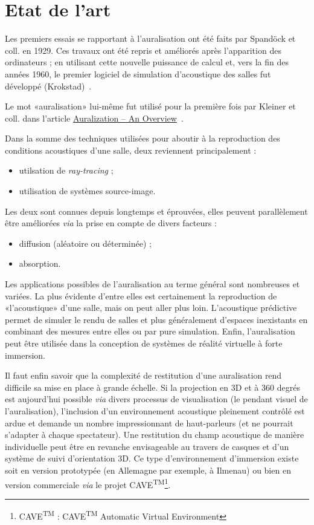 \chapter{Etat de l'art}

Les premiers essais se rapportant à l'auralisation ont été faits par Spandöck et coll. en 1929.
Ces travaux ont été repris et améliorés après l'apparition des ordinateurs ; en utilisant cette nouvelle puissance de
calcul et, vers la fin des années 1960, le premier logiciel de simulation d'acoustique des salles fut développé
(Krokstad)~\cite{Vor08}.

Le mot «auralisation» lui-même fut utilisé pour la première fois par Kleiner et coll. dans l'article
\underline{Auralization -- An Overview}~\cite{Kle93}.

Dans la somme des techniques utilisées pour aboutir à la reproduction des conditions acoustiques d'une salle, deux
reviennent principalement :

\begin{itemize}
    \item utilsation de \textit{ray-tracing} ;
    \item utilisation de systèmes source-image.
\end{itemize}

Les deux sont connues depuis longtemps et éprouvées, elles peuvent parallèlement être améliorées \textit{via} la prise en compte de
divers facteurs :

\begin{itemize}
    \item diffusion (aléatoire ou déterminée) ;
    \item absorption.
\end{itemize}

Les applications possibles de l'auralisation au terme général sont nombreuses et variées. La plus évidente d'entre
elles est certainement la reproduction de «l'acoustique» d'une salle, mais on peut aller plus loin. L'acoustique
prédictive permet de simuler le rendu de salles et plus généralement d'espaces inexistants en combinant des mesures
entre elles ou par pure simulation. Enfin, l'auralisation peut être utilisée dans la conception de systèmes de
réalité virtuelle à forte immersion.

Il faut enfin savoir que la complexité de restitution d'une auralisation rend difficile sa mise en place à grande échelle. Si
la projection en 3D et à 360 degrés est aujourd'hui possible \textit{via} divers processus de visualisation (le pendant
visuel de l'auralisation), l'inclusion d'un environnement acoustique pleinement contrôlé est ardue  et
demande un nombre impressionnant de haut-parleurs (et ne pourrait s'adapter à chaque spectateur). Une restitution du
champ acoustique de manière individuelle peut être en revanche envisageable au travers de casques et d'un système de
suivi d'orientation 3D. Ce type d'environnement d'immersion existe soit en version prototypée (en Allemagne par exemple,
à Ilmenau) ou bien en version commerciale \textit{via} le projet
CAVE\textsuperscript{TM}\footnote{CAVE\textsuperscript{\textsc{TM}} : CAVE\textsuperscript{\textsc{TM}} Automatic
Virtual Environment}.
